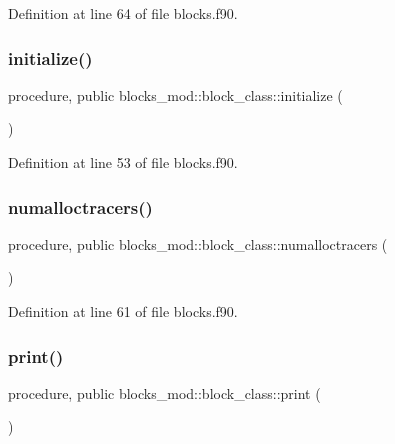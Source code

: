 Definition at line 64 of file blocks.\+f90.

\mbox{\label{structblocks__mod_1_1block__class_ad671745ca5dc3227ddb0ed1d9ff45268}} 
\subsubsection{\texorpdfstring{initialize()}{initialize()}}
{\footnotesize\ttfamily procedure, public blocks\+\_\+mod\+::block\+\_\+class\+::initialize (\begin{DoxyParamCaption}{ }\end{DoxyParamCaption})}



Definition at line 53 of file blocks.\+f90.

\mbox{\label{structblocks__mod_1_1block__class_a7a3f2eb6823a683a6aaa2159b50ee990}} 
\subsubsection{\texorpdfstring{numalloctracers()}{numalloctracers()}}
{\footnotesize\ttfamily procedure, public blocks\+\_\+mod\+::block\+\_\+class\+::numalloctracers (\begin{DoxyParamCaption}{ }\end{DoxyParamCaption})}



Definition at line 61 of file blocks.\+f90.

\mbox{\label{structblocks__mod_1_1block__class_a43b4c133934eaadb55d30cf834d1e28c}} 
\subsubsection{\texorpdfstring{print()}{print()}}
{\footnotesize\ttfamily procedure, public blocks\+\_\+mod\+::block\+\_\+class\+::print (\begin{DoxyParamCaption}{ }\end{DoxyParamCaption})}



